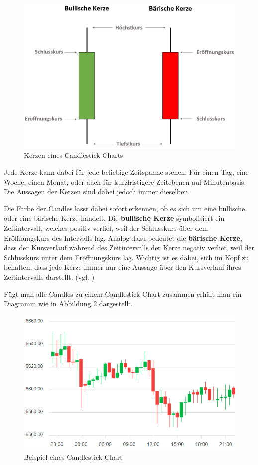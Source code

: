 \documentclass[oneside]{ausarbeitung}
\begin{document}
\begin{figure}[H]
  \centering
  \includegraphics[height=0.45\textheight]{img/candles.png}
  \caption{Kerzen eines Candlestick Charts}
  \label{fig:1}
\end{figure}

Jede Kerze kann dabei für jede beliebige Zeitspanne stehen. Für
einen Tag, eine Woche, einen Monat, oder auch für kurzfristigere
Zeitebenen auf Minutenbasis. Die Aussagen der Kerzen sind dabei jedoch
immer dieselben.

Die Farbe der Candles lässt dabei sofort erkennen, ob es sich um eine
bullische, oder eine bärische Kerze handelt. Die \textbf{bullische
Kerze} symbolisiert ein Zeitintervall, welches positiv verlief, weil
der Schlusskurs über dem Eröffnungskurs des Intervalls lag. Analog
dazu bedeutet die \textbf{bärische Kerze}, dass der Kursverlauf
während des Zeitintervalls der Kerze negativ verlief, weil der
Schlusskurs unter dem Eröffnungskurs lag. Wichtig ist es dabei, sich
im Kopf zu behalten, dass jede Kerze immer nur eine Aussage über den
Kursverlauf ihres Zeitintervalls darstellt. (vgl.
\cite{candles_explained})
 
Fügt man alle Candles zu einem Candlestick Chart zusammen erhält man
ein Diagramm wie in Abbildung \ref{fig:2} dargestellt. \\

\begin{figure}[H]
  \centering
  \includegraphics[height=0.43\textheight]{img/candlestick_chart.png}
  \caption{Beispiel eines Candlestick Chart\cite{candlestick_chart_pic}}
  \label{fig:2}
\end{figure}
\end{document}
